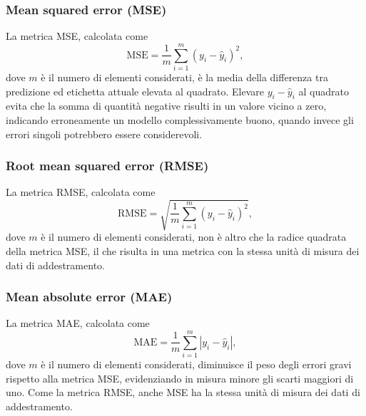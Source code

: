 \subsubsection{Mean squared error (MSE)}
La metrica MSE, calcolata come
\begin{equation*}
    \textrm{MSE} = \frac{1}{m} \sum_{i=1}^{m} (y_i - \hat{y}_i)^2,
\end{equation*}
dove $m$ è il numero di elementi considerati, è la media della differenza tra predizione ed etichetta attuale elevata al quadrato. 
Elevare $y_i - \hat{y}_i$ al quadrato evita che la somma di quantità negative risulti in un valore vicino a zero, indicando erroneamente un modello complessivamente buono, quando invece gli errori singoli potrebbero essere considerevoli.

\subsubsection{Root mean squared error (RMSE)}
La metrica RMSE, calcolata come
\begin{equation*}    
    \textrm{RMSE} = \sqrt{\frac{1}{m} \sum_{i=1}^{m} (y_i - \hat{y}_i)^2},
\end{equation*}
dove $m$ è il numero di elementi considerati, non è altro che la radice quadrata della metrica MSE, il che risulta in una metrica con la stessa unità di misura dei dati di addestramento. 

\subsubsection{Mean absolute error (MAE)}
La metrica MAE, calcolata come
\begin{equation*}    
    \textrm{MAE} = \frac{1}{m} \sum_{i=1}^{m} |y_i - \hat{y}_i|,
\end{equation*}
dove $m$ è il numero di elementi considerati, diminuisce il peso degli errori gravi rispetto alla metrica MSE, evidenziando in misura minore gli scarti maggiori di uno.
Come la metrica RMSE, anche MSE ha la stessa unità di misura dei dati di addestramento. 

